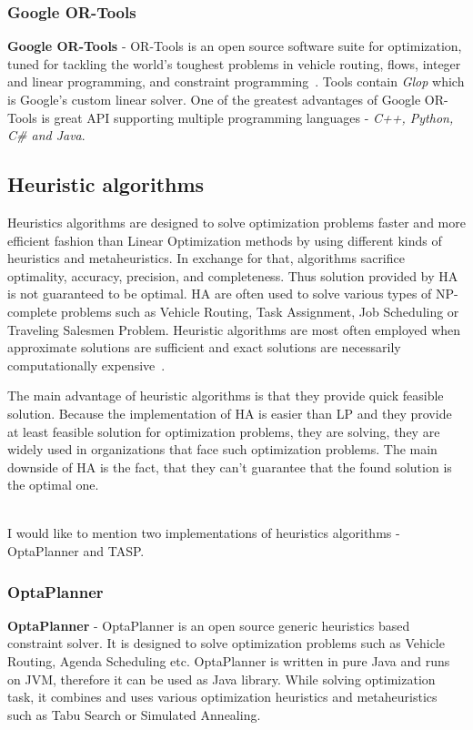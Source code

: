 \subsubsection{Google OR-Tools}
\textbf{Google OR-Tools} - OR-Tools is an open source software suite for optimization,
tuned for tackling the world's toughest problems in vehicle routing, flows,
integer and linear programming, and constraint programming~\cite{web:googleOrTools}.
Tools contain \textit{Glop} which is Google's custom linear solver.
One of the greatest advantages of Google OR-Tools is great API supporting multiple programming languages - \textit{C++, Python, C\# and Java}.


\subsection{Heuristic algorithms}\label{subsec:heuristic-algorithms}
Heuristics algorithms are designed to solve optimization problems faster
and more efficient fashion than Linear Optimization methods by using different kinds of heuristics and metaheuristics.
In exchange for that, algorithms sacrifice optimality, accuracy, precision, and completeness.
Thus solution provided by HA is not guaranteed to be optimal.
HA are often used to solve various types of NP-complete problems such as
Vehicle Routing, Task Assignment, Job Scheduling or Traveling Salesmen Problem.
Heuristic algorithms are most often employed when approximate solutions are sufficient
and exact solutions are necessarily computationally expensive~\cite{papanikolaou2018holistic}.

The main advantage of heuristic algorithms is that they provide quick feasible solution.
Because the implementation of HA is easier than LP and they provide at least feasible solution for optimization problems,
they are solving, they are widely used in organizations that face such optimization problems.
The main downside of HA is the fact, that they can't guarantee that the found solution is the optimal one.

\\I would like to mention two implementations of heuristics algorithms - OptaPlanner and TASP\@.

\subsubsection{OptaPlanner}
\textbf{OptaPlanner} - OptaPlanner is an open source generic heuristics based constraint solver.
It is designed to solve optimization problems such as Vehicle Routing, Agenda Scheduling etc.
OptaPlanner is written in pure Java and runs on JVM, therefore it can be used as Java library.
While solving optimization task, it combines and uses various optimization heuristics and metaheuristics such as
Tabu Search or Simulated Annealing.

